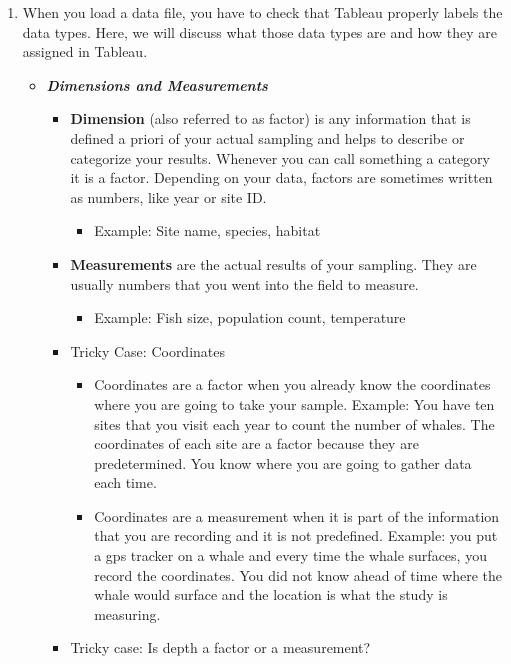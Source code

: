 \documentclass[
]{book}
\providecommand{\tightlist}{%
  \setlength{\itemsep}{0pt}\setlength{\parskip}{0pt}}
\begin{document}
\begin{enumerate}
\def\labelenumi{\arabic{enumi}.}
\tightlist
\item
  When you load a data file, you have to check that Tableau properly labels the data types. Here, we will discuss what those data types are and how they are assigned in Tableau.

  \begin{itemize}
  \tightlist
  \item
    \textbf{\emph{Dimensions and Measurements}}

    \begin{itemize}
    \tightlist
    \item
      \textbf{Dimension} (also referred to as factor) is any information that is defined a priori of your actual sampling and helps to describe or categorize your results. Whenever you can call something a category it is a factor. Depending on your data, factors are sometimes written as numbers, like year or site ID.

      \begin{itemize}
      \tightlist
      \item
        Example: Site name, species, habitat
      \end{itemize}
    \item
      \textbf{Measurements} are the actual results of your sampling. They are usually numbers that you went into the field to measure.

      \begin{itemize}
      \tightlist
      \item
        Example: Fish size, population count, temperature
      \end{itemize}
    \item
      Tricky Case: Coordinates

      \begin{itemize}
      \tightlist
      \item
        Coordinates are a factor when you already know the coordinates where you are going to take your sample. Example: You have ten sites that you visit each year to count the number of whales. The coordinates of each site are a factor because they are predetermined. You know where you are going to gather data each time.
      \item
        Coordinates are a measurement when it is part of the information that you are recording and it is not predefined. Example: you put a gps tracker on a whale and every time the whale surfaces, you record the coordinates. You did not know ahead of time where the whale would surface and the location is what the study is measuring.
      \end{itemize}
    \item
      Tricky case: Is depth a factor or a measurement?


\end{itemize}
\end{itemize}
\end{enumerate}
\end{document}
